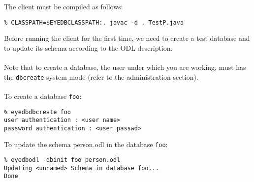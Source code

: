 The client must be compiled as follows:
{\verbsize \begin{verbatim}
% CLASSPATH=$EYEDBCLASSPATH:. javac -d . TestP.java
\end{verbatim}
}
Before running the client for the first time, we need to create a test database
and to update its schema according to the ODL description.
\\
\\
Note that to create a database, the \eyedb user under which you are working,
must has the \texttt{dbcreate} system mode (refer to the administration
section).
\\
\\
To create a database \texttt{foo}:
\verbsize \begin{verbatim}
% eyedbdbcreate foo
user authentication : <user name>
password authentication : <user passwd>
\end{verbatim}
\normalsize
To update the schema person.odl in the database \texttt{foo}:
{\verbsize \begin{verbatim}
% eyedbodl -dbinit foo person.odl
Updating <unnamed> Schema in database foo...
Done
\end{verbatim}
}

